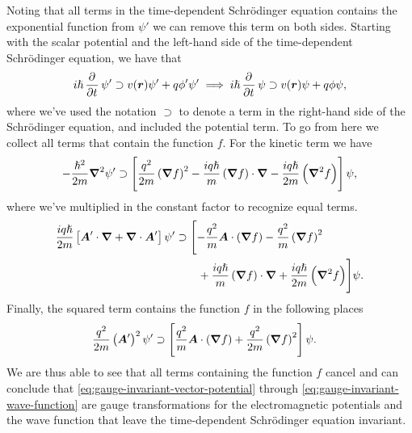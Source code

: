         Noting that all terms in the time-dependent Schrödinger equation
        contains the exponential function from $\psi'$ we can remove this term
        on both sides.
        Starting with the scalar potential and the left-hand side of the
        time-dependent Schrödinger equation, we have that
        \begin{align}
            i\hslash\dpd{}{t}\psi'
            \supset
            v(\vfg{r})\psi'
            +
            q\phi'\psi'
            \implies
            i\hslash\dpd{}{t}\psi
            \supset
            v(\vfg{r})\psi
            +
            q\phi\psi,
        \end{align}
        where we've used the notation $\supset$ to denote a term in the right-hand
        side of the Schrödinger equation, and included the potential term.
        To go from here we collect all terms that contain the function $f$.
        For the kinetic term we have
        \begin{align}
            -\frac{\hslash^2}{2m}\boldsymbol{\nabla}^2\psi'
            \supset
            \left[ 
                \frac{q^2}{2m}\left( \boldsymbol{\nabla}f \right)^2
                - \frac{iq\hslash}{m}\left( \boldsymbol{\nabla}f \right)\cdot\boldsymbol{\nabla}
                - \frac{iq\hslash}{2m}\left( \boldsymbol{\nabla}^2f \right)
             \right]\psi,
        \end{align}
        where we've multiplied in the constant factor to recognize equal terms.
        \begin{align}
            \frac{iq\hslash}{2m}\left[ 
                \boldsymbol{A}'\cdot\boldsymbol{\nabla}
                + \boldsymbol{\nabla}\cdot\boldsymbol{A}'
             \right]\psi'
            &\supset
            \Biggl[
                - \frac{q^2}{m}\boldsymbol{A}\cdot\left( \boldsymbol{\nabla}f \right)
                - \frac{q^2}{m}\left( \boldsymbol{\nabla}f \right)^2
                \nonumber \\
                &\qquad
                + \frac{iq\hslash}{m}\left( \boldsymbol{\nabla}f \right)\cdot\boldsymbol{\nabla}
                + \frac{iq\hslash}{2m}\left( \boldsymbol{\nabla}^2f \right)
            \Biggr]\psi.
        \end{align}
        Finally, the squared term contains the function $f$ in the following
        places
        \begin{align}
            \frac{q^2}{2m}\left( \boldsymbol{A}' \right)^2\psi'
            &\supset
            \left[ 
                \frac{q^2}{m}\boldsymbol{A}\cdot\left( \boldsymbol{\nabla}f \right)
                + \frac{q^2}{2m}\left( \boldsymbol{\nabla}f \right)^2
             \right]\psi.
        \end{align}
        We are thus able to see that all terms containing the function $f$
        cancel and can conclude that
        \autoref{eq:gauge-invariant-vector-potential} through
        \autoref{eq:gauge-invariant-wave-function} are gauge transformations for
        the electromagnetic potentials and the wave function that leave the
        time-dependent Schrödinger equation invariant.

